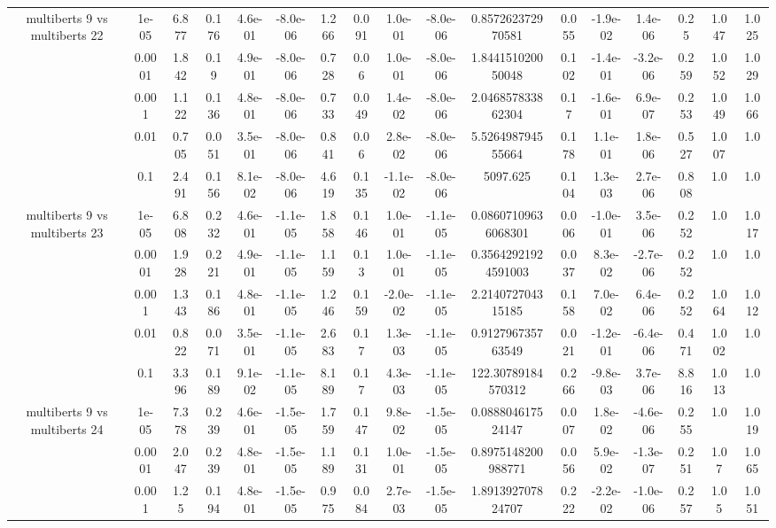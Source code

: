 \begin{tabular}{|c|c|c|c|c|c|c|c|c|c|c|c|c|c|c|c|c|}
\hline
\multirow{5}{*}{multiberts 9 vs multiberts 22} & 1e-05 & 6.877 & 0.176 & 4.6e-01 & -8.0e-06 & 1.266 & 0.091 & 1.0e-01 & -8.0e-06 & 0.857262372970581 & 0.055 & -1.9e-02 & 1.4e-06 & 0.25 & 1.047 & 1.025 \\
 & 0.0001 & 1.842 & 0.19 & 4.9e-01 & -8.0e-06 & 0.728 & 0.06 & 1.0e-01 & -8.0e-06 & 1.844151020050048 & 0.102 & -1.4e-01 & -3.2e-06 & 0.259 & 1.052 & 1.029 \\
 & 0.001 & 1.122 & 0.136 & 4.8e-01 & -8.0e-06 & 0.733 & 0.049 & 1.4e-02 & -8.0e-06 & 2.046857833862304 & 0.17 & -1.6e-01 & 6.9e-07 & 0.253 & 1.049 & 1.066 \\
 & 0.01 & 0.705 & 0.051 & 3.5e-01 & -8.0e-06 & 0.841 & 0.06 & 2.8e-02 & -8.0e-06 & 5.526498794555664 & 0.178 & 1.1e-01 & 1.8e-06 & 0.527 & 1.007 & 1.0 \\
 & 0.1 & 2.491 & 0.156 & 8.1e-02 & -8.0e-06 & 4.619 & 0.135 & -1.1e-02 & -8.0e-06 & 5097.625 & 0.104 & 1.3e-03 & 2.7e-06 & 0.808 & 1.0 & 1.0 \\
\hline
\multirow{5}{*}{multiberts 9 vs multiberts 23} & 1e-05 & 6.808 & 0.232 & 4.6e-01 & -1.1e-05 & 1.858 & 0.146 & 1.0e-01 & -1.1e-05 & 0.08607109636068301 & 0.006 & -1.0e-01 & 3.5e-06 & 0.252 & 1.0 & 1.017 \\
 & 0.0001 & 1.928 & 0.221 & 4.9e-01 & -1.1e-05 & 1.159 & 0.13 & 1.0e-01 & -1.1e-05 & 0.35642921924591003 & 0.037 & 8.3e-02 & -2.7e-06 & 0.252 & 1.0 & 1.0 \\
 & 0.001 & 1.343 & 0.186 & 4.8e-01 & -1.1e-05 & 1.246 & 0.159 & -2.0e-02 & -1.1e-05 & 2.214072704315185 & 0.158 & 7.0e-02 & 6.4e-06 & 0.252 & 1.064 & 1.012 \\
 & 0.01 & 0.822 & 0.071 & 3.5e-01 & -1.1e-05 & 2.683 & 0.17 & 1.3e-03 & -1.1e-05 & 0.912796735763549 & 0.021 & -1.2e-01 & -6.4e-06 & 0.471 & 1.002 & 1.0 \\
 & 0.1 & 3.396 & 0.189 & 9.1e-02 & -1.1e-05 & 8.189 & 0.17 & 4.3e-03 & -1.1e-05 & 122.30789184570312 & 0.266 & -9.8e-03 & 3.7e-06 & 8.816 & 1.013 & 1.0 \\
\hline
\multirow{5}{*}{multiberts 9 vs multiberts 24} & 1e-05 & 7.378 & 0.239 & 4.6e-01 & -1.5e-05 & 1.759 & 0.147 & 9.8e-02 & -1.5e-05 & 0.088804617524147 & 0.007 & 1.8e-02 & -4.6e-06 & 0.255 & 1.0 & 1.019 \\
 & 0.0001 & 2.047 & 0.239 & 4.8e-01 & -1.5e-05 & 1.189 & 0.131 & 1.0e-01 & -1.5e-05 & 0.8975148200988771 & 0.056 & 5.9e-02 & -1.3e-07 & 0.251 & 1.07 & 1.065 \\
 & 0.001 & 1.25 & 0.194 & 4.8e-01 & -1.5e-05 & 0.975 & 0.084 & 2.7e-03 & -1.5e-05 & 1.891392707824707 & 0.222 & -2.2e-02 & -1.0e-06 & 0.257 & 1.05 & 1.051 \\

\end{tabular}
